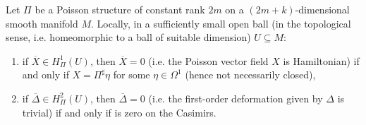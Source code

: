 \documentclass[main.tex]{subfiles}
\begin{document}
\begin{lemma}
\label{lemma:poisson_cohomology_is_loc_trivial}
	Let $\Pi$ be a Poisson structure of constant rank $2m$ on a $(2m+k)$-dimensional smooth manifold $M$. Locally, in a sufficiently small open ball (in the topological sense, i.e. homeomorphic to a ball of suitable dimension) $U \subseteq M$:
	\begin{enumerate}
		\item if $\overline X \in H^1_\Pi(U)$, then $\overline X = 0$ (i.e. the Poisson vector field $X$ is Hamiltonian) if and only if $X = \Pi^\sharp \eta$ for some $\eta \in \Omega^1$ (hence not necessarily closed),
		\item if $\overline\Delta \in H^2_\Pi(U)$, then $\overline\Delta =0$ (i.e. the first-order deformation given by $\Delta$ is trivial) if and only if is zero on the Casimirs.
	\end{enumerate}
\end{lemma}
\end{document}
